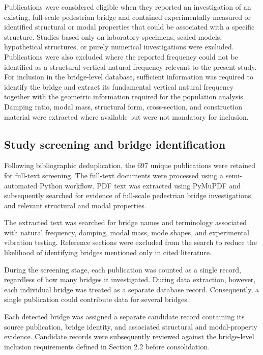 \documentclass[preprint,a4paper,12pt]{elsarticle}
\begin{document}
Publications were considered eligible when they reported an investigation of an existing, full-scale pedestrian bridge and contained experimentally measured or identified structural or modal properties that could be associated with a specific structure.
Studies based only on laboratory specimens, scaled models, hypothetical structures, or purely numerical investigations were excluded. 
Publications were also excluded where the reported frequency could not be identified as a structural vertical natural frequency relevant to the present study.
For inclusion in the bridge-level database, sufficient information was required to identify the bridge and extract its fundamental vertical natural frequency together with the geometric information required for the population analysis.
Damping ratio, modal mass, structural form, cross-section, and construction material were extracted where available but were not mandatory for inclusion.

\subsection{Study screening and bridge identification}

Following bibliographic deduplication, the 697 unique publications were retained for full-text screening. 
The full-text documents were processed using a semi-automated Python workflow.
PDF text was extracted using PyMuPDF and subsequently searched for evidence of full-scale pedestrian bridge investigations and relevant structural and modal properties.

The extracted text was searched for bridge names and terminology associated with natural frequency, damping, modal mass, mode shapes, and experimental vibration testing.
Reference sections were excluded from the search to reduce the likelihood of identifying bridges mentioned only in cited literature.

During the screening stage, each publication was counted as a single record, regardless of how many bridges it investigated. 
During data extraction, however, each individual bridge was treated as a separate database record. 
Consequently, a single publication could contribute data for several bridges.

Each detected bridge was assigned a separate candidate record containing its source publication, bridge identity, and associated structural and modal-property evidence. 
Candidate records were subsequently reviewed against the bridge-level inclusion requirements defined in Section 2.2 before consolidation.
\end{document}

